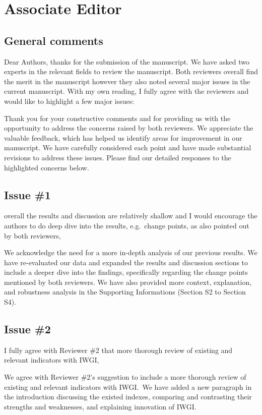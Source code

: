 \section{Associate Editor}\label{editor}

\subsection{General comments}
\RC{} Dear Authors, thanks for the submission of the manuscript. We have asked two experts in the relevant fields to review the manuscript. Both reviewers overall find the merit in the manuscript however they also noted several major issues in the current manuscript. With my own reading, I fully agree with the reviewers and would like to highlight a few major issues:

\AR{} Thank you for your constructive comments and for providing us with the opportunity to address the concerns raised by both reviewers. We appreciate the valuable feedback, which has helped us identify areas for improvement in our manuscript. We have carefully considered each point and have made substantial revisions to address these issues. Please find our detailed responses to the highlighted concerns below.

\subsection{Issue \#1}
\RC{} overall the results and discussion are relatively shallow and I would encourage the authors to do deep dive into the results, e.g.\ change points, as also pointed out by both reviewers,

\AR{} We acknowledge the need for a more in-depth analysis of our previous results. We have re-evaluated our data and expanded the results and discussion sections to include a deeper dive into the findings, specifically regarding the change points mentioned by both reviewers. We have also provided more context, explanation, and robustness analysis in the Supporting Informations (Section S2 to Section S4).

\subsection{Issue \#2}
\RC{} I fully agree with Reviewer \#2 that more thorough review of existing and relevant indicators with IWGI,

\AR{} We agree with Reviewer \#2's suggestion to include a more thorough review of existing and relevant indicators with IWGI.\ We have added a new paragraph in the introduction discussing the existed indexes, comparing and contrasting their strengths and weaknesses, and explaining innovation of IWGI.\

